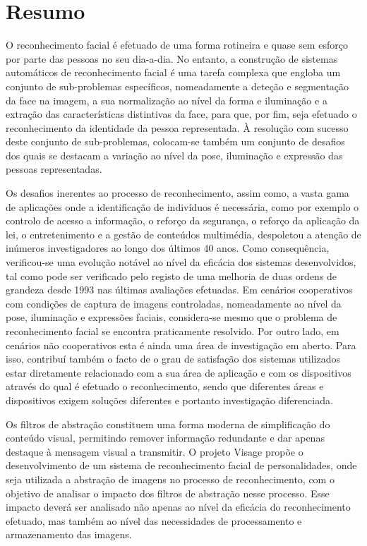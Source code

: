 \chapter*{Resumo}
O reconhecimento facial é efetuado de uma forma rotineira e quase sem esforço por parte das pessoas no seu dia-a-dia. No entanto, a construção de sistemas automáticos de reconhecimento facial é uma tarefa complexa que engloba um conjunto de sub-problemas específicos, nomeadamente a deteção e segmentação da face na imagem, a sua normalização ao nível da forma e iluminação e a extração das características distintivas da face, para que, por fim, seja efetuado o reconhecimento da identidade da pessoa representada. À resolução com sucesso deste conjunto de sub-problemas, colocam-se também um conjunto de desafios dos quais se destacam a variação ao nível da pose, iluminação e expressão das pessoas representadas.

Os desafios inerentes ao processo de reconhecimento, assim como, a vasta gama de aplicações onde a identificação de indivíduos é necessária, como por exemplo o controlo de acesso a informação, o reforço da segurança, o reforço da aplicação da lei, o entretenimento e a gestão de conteúdos multimédia, despoletou a atenção de inúmeros investigadores ao longo dos últimos 40 anos. Como consequência, verificou-se uma evolução notável ao nível da eficácia dos sistemas desenvolvidos, tal como pode ser verificado pelo registo de uma melhoria de duas ordens de grandeza desde 1993 nas últimas avaliações efetuadas. Em cenários cooperativos com condições de captura de imagens controladas, nomeadamente ao nível da pose, iluminação e expressões faciais, considera-se mesmo que o problema de reconhecimento facial se encontra praticamente resolvido. Por outro lado, em cenários não cooperativos esta é ainda uma área de investigação em aberto. Para isso, contribuí também o facto de o grau de satisfação dos sistemas utilizados estar diretamente relacionado com a sua área de aplicação e com os dispositivos através do qual é efetuado o reconhecimento, sendo que diferentes áreas e dispositivos exigem soluções diferentes e portanto investigação diferenciada.

Os filtros de abstração constituem uma forma moderna de simplificação do conteúdo visual, permitindo remover informação redundante e dar apenas destaque à mensagem visual a transmitir. O projeto Visage propõe o desenvolvimento de um sistema de reconhecimento facial de personalidades, onde seja utilizada a abstração de imagens no processo de reconhecimento, com o objetivo de analisar o impacto dos filtros de abstração nesse processo. Esse impacto deverá ser analisado não apenas ao nível da eficácia do reconhecimento efetuado, mas também ao nível das necessidades de processamento e armazenamento das imagens.

